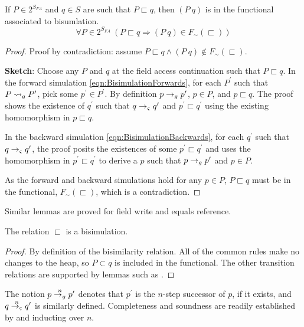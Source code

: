 \begin{lemma}
If $P \in 2^{S_\mathit{FA}}$ and $q \in S$ are such that $P \sqsubset q$, then $(P\ q)$ is in the functional associated to bisumlation.
\label{lem:access}
$$
\forall P \in 2^{S_\mathit{FA}}\ (P \sqsubset q \Rightarrow (P\ q) \in F_\sim(\sqsubset))
$$
\end{lemma}

\begin{proof}
Proof by contradiction: assume $P \sqsubset q \wedge (P\ q) \not\in F_\sim(\sqsubset)$.

\noindent\textbf{Sketch}: Choose any $P$ and $q$ at the field access continuation such
that $P \sqsubset q$. In the forward simulation
\eqref{eqn:BisimulationForwards}, for each $P^\prime$ such that $P
\leadsto_{g} P^\prime$, pick some $p^\prime \in P^\prime$. By definition $p \rightarrow_{g}
p^\prime$, $p \in P$, and $p \sqsubset q$. The proof shows the
existence of $q^\prime$ such that $q \rightarrow_{\varsigma} q^\prime$ and $p^\prime
\sqsubset q^\prime$ using the existing homomorphism in $p \sqsubset q$.

In the backward simulation \eqref{eqn:BisimulationBackwards}, for each
$q^\prime$ such that $q \rightarrow_{\varsigma} q^\prime$, the proof posits the
existences of some $p^\prime \sqsubset q^\prime$ and uses the
homomorphism in $p^\prime \sqsubset q^\prime$ to derive a $p$ such
that $p \rightarrow_{g} p^\prime$ and $p \in P$.

As the forward and backward simulations hold for any $p \in P$, $P
\sqsubset q$ must be in the functional, $F_\sim(\sqsubset)$, which is
a contradiction.
\end{proof}
Similar lemmas are proved for field write and equals reference.

\begin{theorem}
\label{th:bisim}
The relation $\sqsubset$ is a bisimulation.
\end{theorem}
\begin{proof}
By definition of the bisimilarity relation. All of the common rules
make no changes to the heap, so $P \subset q$ is included in the
functional. The other transition relations are supported by lemmas
such as .
\end{proof}

The notion $p \stackrel{n}{\rightarrow_{g}} p^\prime$ denotes that $p^\prime$ is
the $n$-step successor of $p$, if it exists, and $q
\stackrel{n}{\rightarrow_{\varsigma}} q^\prime$ is similarly defined. Completeness and
soundness are readily established by  and inducting
over $n$.

